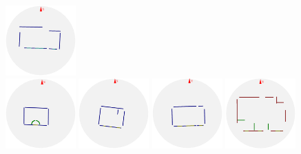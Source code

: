 \begin{figure}[t]
\begin{minipage}[c]{0.5\textwidth}
  \includegraphics[width=0.24\textwidth]{p3m_8_2D_walls_rotate}\\ %
  \includegraphics[width=0.24\textwidth]{p3m_2_2D_walls_rotate} %
  \includegraphics[width=0.24\textwidth]{p3m_3_2D_walls_rotate} %
  \includegraphics[width=0.24\textwidth]{p3m_4_2D_walls_rotate} %
  \includegraphics[width=0.24\textwidth]{p3m_9_2D_walls_rotate} %
\end{minipage}
\vspace{-0.175\textwidth}
\\
\begin{small}
\begin{minipage}{0.245\textwidth}~\end{minipage}
\begin{minipage}{0.245\textwidth}~\end{minipage}

\end{small}
\end{figure}
